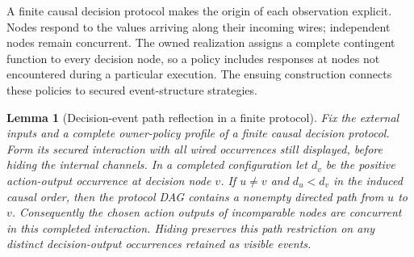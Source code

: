 \documentclass[11pt,a4paper]{article}
\numberwithin{equation}{section}
\newtheorem{lemma}[theorem]{Lemma}
\theoremstyle{definition}
\theoremstyle{remark}
\theoremstyle{plain}
\begin{document}
A finite causal decision protocol makes the origin of each
observation explicit. Nodes respond to the values arriving along their
incoming wires; independent nodes remain concurrent. The owned
realization assigns a complete contingent function to every decision
node, so a policy includes responses at nodes not encountered during a
particular execution. The ensuing construction connects these policies
to secured event-structure strategies.

\begin{lemma}[Decision-event path reflection in a finite protocol]
\label{lem:egt-protocol-event-path}
Fix the external inputs and a complete owner-policy profile of a finite
causal decision protocol. Form its secured interaction with all wired
occurrences still displayed, before hiding the internal channels. In a
completed configuration let $d_v$ be the positive action-output
occurrence at decision node $v$. If $u\ne v$ and $d_u<d_v$ in the
induced causal order, then the protocol DAG contains a nonempty
directed path from $u$ to $v$. Consequently the chosen action outputs
of incomparable nodes are concurrent in this completed interaction.
Hiding preserves this path restriction on any distinct decision-output
occurrences retained as visible events.
\end{lemma}
\end{document}
